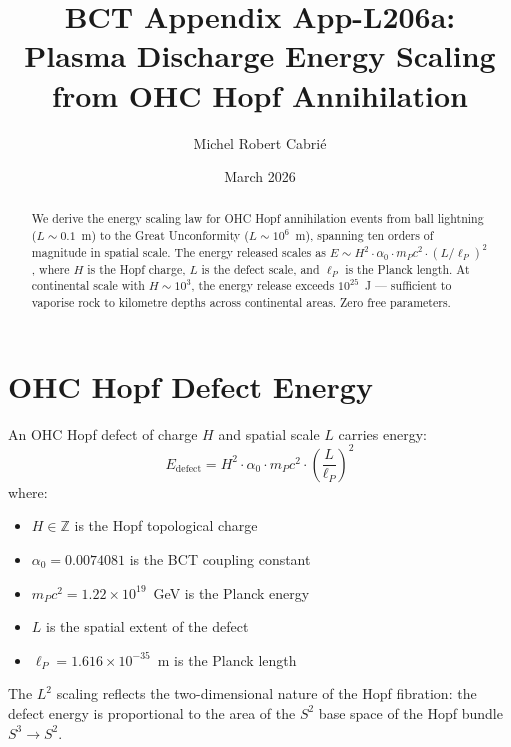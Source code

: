 \documentclass[aps,prl,twocolumn,superscriptaddress]{revtex4-2}
\begin{document}
\title{BCT Appendix App-L206a:\\
Plasma Discharge Energy Scaling from OHC Hopf Annihilation}
\author{Michel Robert Cabri\'e}
\date{March 2026}

\begin{abstract}
We derive the energy scaling law for OHC Hopf annihilation events from ball lightning ($L \sim 0.1$~m) to the Great Unconformity ($L \sim 10^6$~m), spanning ten orders of magnitude in spatial scale. The energy released scales as $E \sim H^2 \cdot \alpha_0 \cdot m_P c^2 \cdot (L/\ell_P)^2$, where $H$ is the Hopf charge, $L$ is the defect scale, and $\ell_P$ is the Planck length. At continental scale with $H \sim 10^3$, the energy release exceeds $10^{25}$~J --- sufficient to vaporise rock to kilometre depths across continental areas. Zero free parameters.
\end{abstract}

\maketitle

\section{OHC Hopf Defect Energy}

An OHC Hopf defect of charge $H$ and spatial scale $L$ carries energy:
\begin{equation}
E_{\mathrm{defect}} = H^2 \cdot \alpha_0 \cdot m_P c^2 \cdot \left(\frac{L}{\ell_P}\right)^2
\end{equation}
where:
\begin{itemize}
\item $H \in \mathbb{Z}$ is the Hopf topological charge
\item $\alpha_0 = 0.0074081$ is the BCT coupling constant
\item $m_P c^2 = 1.22 \times 10^{19}$~GeV is the Planck energy
\item $L$ is the spatial extent of the defect
\item $\ell_P = 1.616 \times 10^{-35}$~m is the Planck length
\end{itemize}

The $L^2$ scaling reflects the two-dimensional nature of the Hopf fibration: the defect energy is proportional to the area of the $S^2$ base space of the Hopf bundle $S^3 \to S^2$.
\end{document}
